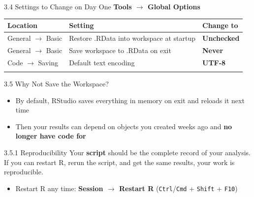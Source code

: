 \documentclass[
  ignorenonframetext,
  aspectratio=169,
]{beamer}
\newcounter{none} %
\providecommand{\tightlist}{%
  \setlength{\itemsep}{0pt}\setlength{\parskip}{0pt}}
\begin{document}
\begin{frame}{3.4 Settings to Change on Day One}
\protect{}\label{sec-settings}
\textbf{Tools \(\rightarrow\) Global Options}

{\def\LTcaptype{none} %
\begin{longtable}[]{@{}
  >{\raggedright\arraybackslash}p{}
  >{\raggedright\arraybackslash}p{}
  >{\raggedright\arraybackslash}p{}@{}}
\toprule\noalign{}
\begin{minipage}[b]{\linewidth}\raggedright
Location
\end{minipage} & \begin{minipage}[b]{\linewidth}\raggedright
Setting
\end{minipage} & \begin{minipage}[b]{\linewidth}\raggedright
Change to
\end{minipage} \\
\midrule\noalign{}
\endhead
General \(\rightarrow\) Basic & Restore .RData into workspace at startup
& \textbf{Unchecked} \\
General \(\rightarrow\) Basic & Save workspace to .RData on exit &
\textbf{Never} \\
Code \(\rightarrow\) Saving & Default text encoding & \textbf{UTF-8} \\
\bottomrule\noalign{}
\end{longtable}
}
\end{frame}

\begin{frame}[fragile]{3.5 Why Not Save the Workspace?}
\protect{}\label{why-not-save-the-workspace}
\begin{itemize}
\tightlist
\item
  By default, RStudio saves everything in memory on exit and reloads it
  next time
\item
  Then your results can depend on objects you created weeks ago and
  \textbf{no longer have code for}
\end{itemize}

\begin{alertblock}{3.5.1 Reproducibility}
\protect{}\label{reproducibility}
Your \textbf{script} should be the complete record of your analysis. If
you can restart R, rerun the script, and get the same results, your work
is reproducible.

\begin{itemize}
\tightlist
\item
  Restart R any time: \textbf{Session \(\rightarrow\) Restart R}
  (\texttt{Ctrl}/\texttt{Cmd} + \texttt{Shift} + \texttt{F10})
\end{itemize}
\end{alertblock}
\end{frame}
\end{document}
